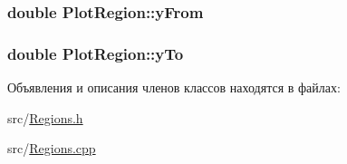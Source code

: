 \hypertarget{class_plot_region_acf10bb3e21dc8efeadbc2ccd128a6772}{
\subsubsection[{y\-From}]{\setlength{\rightskip}{0pt plus 5cm}double Plot\-Region\-::y\-From\hspace{0.3cm}{\ttfamily [protected]}}}\label{class_plot_region_acf10bb3e21dc8efeadbc2ccd128a6772}
\hypertarget{class_plot_region_ad97dd7a58a12907c939ad3d764ad0a7d}{
\subsubsection[{y\-To}]{\setlength{\rightskip}{0pt plus 5cm}double Plot\-Region\-::y\-To\hspace{0.3cm}{\ttfamily [protected]}}}\label{class_plot_region_ad97dd7a58a12907c939ad3d764ad0a7d}


Объявления и описания членов классов находятся в файлах\-:\begin{DoxyCompactItemize}
\item 
src/\hyperlink{_regions_8h}{Regions.\-h}\item 
src/\hyperlink{_regions_8cpp}{Regions.\-cpp}\end{DoxyCompactItemize}
